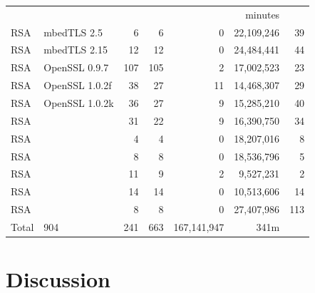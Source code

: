 \begin{table}[]
\begin{tabular}{llrrrrr}
                         &                        &                     &                      &                 & minutes            \\\cline{7-7}
      RSA &    mbedTLS 2.5   & 6            & 6          & 0                    & 22,109,246    & 39      \\
      RSA &    mbedTLS 2.15    & 12          & 12     & 0                    & 24,484,441    & 44        \\
      RSA &     OpenSSL 0.9.7      & 107     & 105           & 2                    & 17,002,523   & 23  \\
      RSA &    OpenSSL 1.0.2f      & 38                     & 27                  & 11                   & 14,468,307   & 29    \\
      RSA &   OpenSSL 1.0.2k      & 36              & 27                  & 9                    & 15,285,210   & 40      \\
      RSA &          & 31                     & 22                  & 9                    & 16,390,750   & 34      \\
      RSA &         & 4                      &  4                  & 0                    & 18,207,016   & 8         \\
      RSA &            & 8                      &  8                  & 0                    & 18,536,796    & 5       \\
      RSA & & 11& 9& 2& 9,527,231& 2 \\
      RSA & & 14& 14& 0& 10,513,606& 14  \\
      RSA &        & 8                      &  8                  & 0                    & 27,407,986    & 113    \\

      Total              & 904                    & 241                 & 663                & 167,141,947      & 341m  \\\hline
  \end{tabular}
\end{table}


\section{Discussion}

